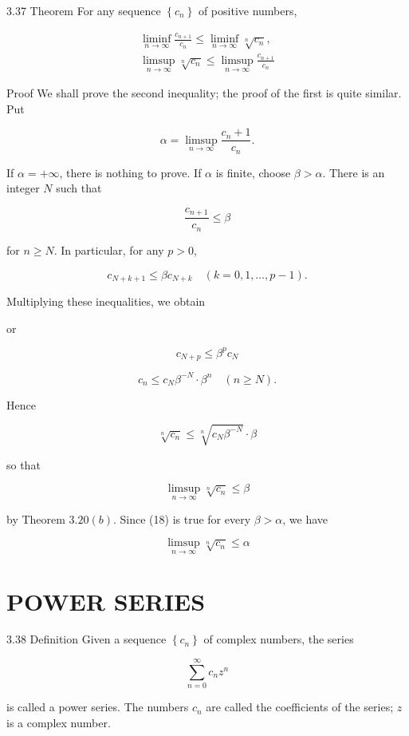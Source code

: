 \documentclass[10pt]{article}
\begin{document}
3.37 Theorem For any sequence $\left\{c_{n}\right\}$ of positive numbers,

$$
\begin{gathered}
\liminf _{n \rightarrow \infty} \frac{c_{n+1}}{c_{n}} \leq \liminf _{n \rightarrow \infty} \sqrt[n]{c_{n}}, \\
\limsup _{n \rightarrow \infty} \sqrt[n]{c_{n}} \leq \limsup _{n \rightarrow \infty} \frac{c_{n+1}}{c_{n}}
\end{gathered}
$$

Proof We shall prove the second inequality; the proof of the first is quite similar. Put

$$
\alpha=\limsup _{n \rightarrow \infty} \frac{c_{n}+1}{c_{n}} .
$$

If $\alpha=+\infty$, there is nothing to prove. If $\alpha$ is finite, choose $\beta>\alpha$. There is an integer $N$ such that

$$
\frac{c_{n+1}}{c_{n}} \leq \beta
$$

for $n \geq N$. In particular, for any $p>0$,

$$
c_{N+k+1} \leq \beta c_{N+k} \quad(k=0,1, \ldots, p-1) .
$$

Multiplying these inequalities, we obtain

or

$$
c_{N+p} \leq \beta^{p} c_{N}
$$

$$
c_{n} \leq c_{N} \beta^{-N} \cdot \beta^{n} \quad(n \geq N) .
$$

Hence

$$
\sqrt[n]{c_{n}} \leq \sqrt[n]{c_{N} \beta^{-N}} \cdot \beta
$$

so that

$$
\limsup _{n \rightarrow \infty} \sqrt[n]{c_{n}} \leq \beta
$$

by Theorem $3.20(b)$. Since (18) is true for every $\beta>\alpha$, we have

$$
\limsup _{n \rightarrow \infty} \sqrt[n]{c_{n}} \leq \alpha
$$

\section{POWER SERIES}
3.38 Definition Given a sequence $\left\{c_{n}\right\}$ of complex numbers, the series

$$
\sum_{n=0}^{\infty} c_{n} z^{n}
$$

is called a power series. The numbers $c_{n}$ are called the coefficients of the series; $z$ is a complex number.
\end{document}
